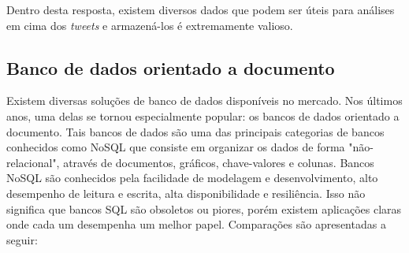 Dentro desta resposta, existem diversos dados que podem ser úteis para análises em cima dos \textit{tweets} e armazená-los é extremamente valioso.

\subsection{Banco de dados orientado a documento}

Existem diversas soluções de banco de dados disponíveis no mercado. Nos últimos anos, uma delas se tornou especialmente popular: os bancos de dados orientado a documento\cite{bhuvan2015technical}. Tais bancos de dados são uma das principais categorias de bancos conhecidos como \ac{NoSQL} que consiste em organizar os dados de forma "não-relacional", através de documentos, gráficos, chave-valores e colunas. Bancos NoSQL são conhecidos pela facilidade de modelagem e desenvolvimento, alto desempenho de leitura e escrita, alta disponibilidade e resiliência. Isso não significa que bancos \ac{SQL} são obsoletos ou piores, porém existem aplicações claras onde cada um desempenha um melhor papel. Comparações são apresentadas a seguir:


